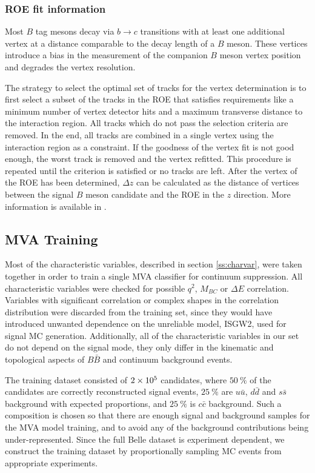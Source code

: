 \subsubsection{ROE fit information}

Most $B$ tag mesons decay via $b \to c$ transitions with at least one additional vertex at a distance comparable to the decay length of a $B$ meson. These vertices introduce a bias in the measurement of the companion $B$ meson vertex position and degrades the vertex resolution.

The strategy to select the optimal set of tracks for the vertex determination is to first select a subset of the tracks in the ROE that satisfies requirements like a minimum number of vertex detector hits and a maximum transverse distance to the interaction region. All tracks which do not pass the selection criteria are removed. In the end, all tracks are combined in a single vertex using the interaction region as a constraint. If the goodness of the vertex fit is not good enough, the worst track is removed and the vertex refitted. This procedure is repeated until the criterion is satisfied or no tracks are left. After the vertex of the ROE has been determined, $\Delta z$ can be calculated as the distance of vertices between the signal $B$ meson candidate and the ROE in the $z$ direction.
More information is available in \cite{bevan2014physics}.

\subsection{MVA Training}
\label{ss:qqmva}
Most of the characteristic variables, described in section \ref{ss:charvar}, were taken together in order to train a single MVA classifier for continuum suppression. All characteristic variables were checked for possible $q^2$, $M_{BC}$ or $\Delta E$ correlation. Variables with significant correlation or complex shapes in the correlation distribution were discarded from the training set, since they would have introduced unwanted dependence on the unreliable model, ISGW2, used for signal MC generation. Additionally, all of the characteristic variables in our set do not depend on the signal mode, they only differ in the kinematic and topological aspects of $B \bar B$ and continuum background events.

The training dataset consisted of $2\times 10^{5}$ candidates, where $50~\%$ of the candidates are correctly reconstructed signal events, $25~\%$ are $u \bar u$, $d \bar d$ and $s \bar s$ background with expected proportions, and $25~\%$ is $c \bar c$ background. Such a composition is chosen so that there are enough signal and background samples for the MVA model training, and to avoid any of the background contributions being under-represented. Since the full Belle dataset is experiment dependent, we construct the training dataset by proportionally sampling MC events from appropriate experiments.

